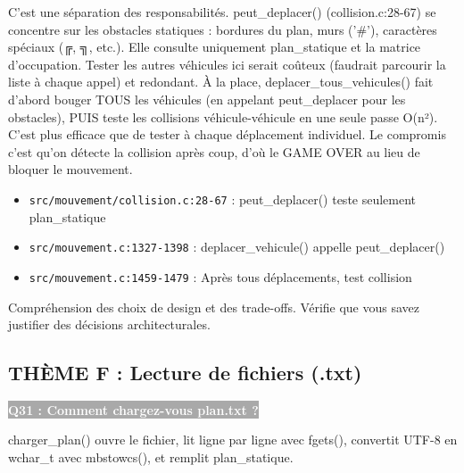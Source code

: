 \documentclass[12pt,a4paper]{article}
\newcommand{\question}[1]{%
    \vspace{0.5cm}
    \noindent\colorbox{darkgray}{\textcolor{white}{\textbf{#1}}}
    \vspace{0.3cm}
}
\begin{document}
\begin{reponse_longue}
C'est une séparation des responsabilités. peut\_deplacer() (collision.c:28-67) se concentre sur les obstacles statiques : bordures du plan, murs ('\#'), caractères spéciaux (╔, ╗, etc.). Elle consulte uniquement plan\_statique et la matrice d'occupation. Tester les autres véhicules ici serait coûteux (faudrait parcourir la liste à chaque appel) et redondant. À la place, deplacer\_tous\_vehicules() fait d'abord bouger TOUS les véhicules (en appelant peut\_deplacer pour les obstacles), PUIS teste les collisions véhicule-véhicule en une seule passe O(n²). C'est plus efficace que de tester à chaque déplacement individuel. Le compromis c'est qu'on détecte la collision après coup, d'où le GAME OVER au lieu de bloquer le mouvement.
\end{reponse_longue}

\begin{reference_code}
\begin{itemize}
    \item \texttt{src/mouvement/collision.c:28-67} : peut\_deplacer() teste seulement plan\_statique
    \item \texttt{src/mouvement.c:1327-1398} : deplacer\_vehicule() appelle peut\_deplacer()
    \item \texttt{src/mouvement.c:1459-1479} : Après tous déplacements, test collision
\end{itemize}
\end{reference_code}

\begin{objectif_prof}
Compréhension des choix de design et des trade-offs. Vérifie que vous savez justifier des décisions architecturales.
\end{objectif_prof}

\subsection{THÈME F : Lecture de fichiers (.txt)}

\question{Q31 : Comment chargez-vous plan.txt ?}

\begin{reponse_courte}
charger\_plan() ouvre le fichier, lit ligne par ligne avec fgets(), convertit UTF-8 en wchar\_t avec mbstowcs(), et remplit plan\_statique.
\end{reponse_courte}
\end{document}

